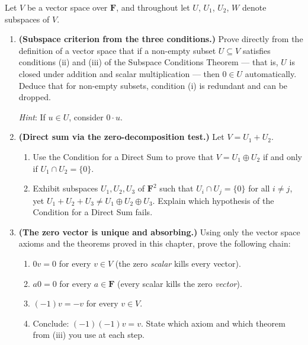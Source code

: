 \begin{remark*}
Let $V$ be a vector space over $\mathbf{F}$, and throughout let $U$, $U_1$,
$U_2$, $W$ denote subspaces of $V$.

\begin{enumerate}[label=(\alph*)]

\item \textbf{(Subspace criterion from the three conditions.)}
Prove directly from the definition of a vector space that if a non-empty subset
$U \subseteq V$ satisfies conditions (ii) and (iii) of the Subspace Conditions
Theorem --- that is, $U$ is closed under addition and scalar multiplication ---
then $0 \in U$ automatically. Deduce that for non-empty subsets, condition (i)
is redundant and can be dropped.

\textit{Hint}: If $u \in U$, consider $0 \cdot u$.

\item \textbf{(Direct sum via the zero-decomposition test.)}
Let $V = U_1 + U_2$.
\begin{enumerate}[label=(\roman*)]
  \item Use the Condition for a Direct Sum to prove that $V = U_1 \oplus U_2$
        if and only if $U_1 \cap U_2 = \{0\}$.
  \item Exhibit subspaces $U_1, U_2, U_3$ of $\mathbf{F}^2$ such that
        $U_i \cap U_j = \{0\}$ for all $i \neq j$, yet
        $U_1 + U_2 + U_3 \neq U_1 \oplus U_2 \oplus U_3$.
        Explain which hypothesis of the Condition for a Direct Sum fails.
\end{enumerate}

\item \textbf{(The zero vector is unique and absorbing.)}
Using only the vector space axioms and the theorems proved in this chapter,
prove the following chain:
\begin{enumerate}[label=(\roman*)]
  \item $0v = 0$ for every $v \in V$ (the zero \emph{scalar} kills every vector).
  \item $a0 = 0$ for every $a \in \mathbf{F}$ (every scalar kills the zero \emph{vector}).
  \item $(-1)v = -v$ for every $v \in V$.
  \item Conclude: $(-1)(-1)v = v$. State which axiom and which theorem from (iii)
        you use at each step.
\end{enumerate}


\end{enumerate}
\end{remark*}
